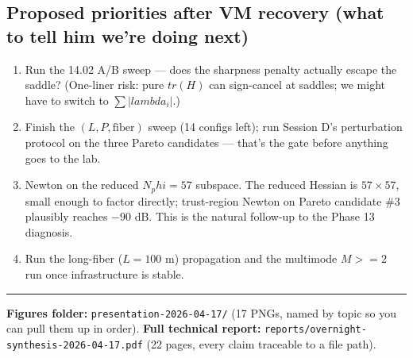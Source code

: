 \documentclass[11pt,letterpaper]{article}
\def\varphi{phi}\def\lambda{lambda}\def\mathrm#1{#1}%
\def\geq{>=}\def\leq{<=}\def\approx{~}%
\begin{document}
\subsection*{Proposed priorities after VM recovery (what to tell him we're doing next)}
\begin{enumerate}[leftmargin=*]
  \item Run the 14.02 A/B sweep --- does the sharpness penalty actually escape the saddle? (One-liner risk: pure $\mathrm{tr}(H)$ can sign-cancel at saddles; we might have to switch to $\sum|\lambda_i|$.)
  \item Finish the $(L, P, \text{fiber})$ sweep (14 configs left); run Session D's perturbation protocol on the three Pareto candidates --- that's the gate before anything goes to the lab.
  \item Newton on the reduced $\mathrm{N}_\varphi = 57$ subspace. The reduced Hessian is $57 \times 57$, small enough to factor directly; trust-region Newton on Pareto candidate \#3 plausibly reaches $-90$ dB. This is the natural follow-up to the Phase 13 diagnosis.
  \item Run the long-fiber ($L = 100$ m) propagation and the multimode $M \geq 2$ run once infrastructure is stable.
\end{enumerate}

\vspace{0.8em}
\hrule
\vspace{0.3em}

\textbf{Figures folder:} \texttt{presentation-2026-04-17/} (17 PNGs, named by topic so you can pull them up in order). \textbf{Full technical report:} \texttt{reports/overnight-synthesis-2026-04-17.pdf} (22 pages, every claim traceable to a file path).
\end{document}
